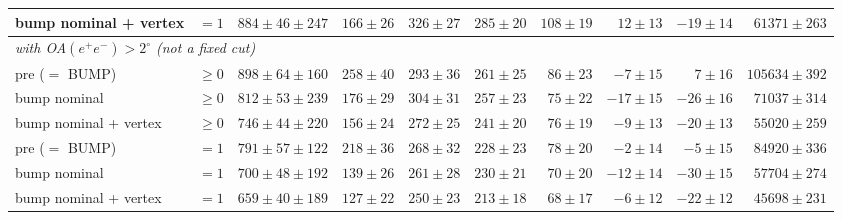 \begin{table}[H]
\begin{tabular}{llcrrrrrrr}
bump nominal + vertex & $=1$ & $884\pm46\pm247$ & $166\pm26$ & $326\pm27$ & $285\pm20$ & $108\pm19$ & $12\pm13$ & $-19\pm14$ & $61371\pm263$ \\
\midrule
\multicolumn{10}{l}{\emph{with OA$(e^+e^-)>2^\circ$ (not a fixed cut)}} \\
pre ($=$ BUMP) & $\geq0$ & $898\pm64\pm160$ & $258\pm40$ & $293\pm36$ & $261\pm25$ & $86\pm23$ & $-7\pm15$ & $7\pm16$ & $105634\pm392$ \\
bump nominal & $\geq0$ & $812\pm53\pm239$ & $176\pm29$ & $304\pm31$ & $257\pm23$ & $75\pm22$ & $-17\pm15$ & $-26\pm16$ & $71037\pm314$ \\
bump nominal + vertex & $\geq0$ & $746\pm44\pm220$ & $156\pm24$ & $272\pm25$ & $241\pm20$ & $76\pm19$ & $-9\pm13$ & $-20\pm13$ & $55020\pm259$ \\
\addlinespace
pre ($=$ BUMP) & $=1$ & $791\pm57\pm122$ & $218\pm36$ & $268\pm32$ & $228\pm23$ & $78\pm20$ & $-2\pm14$ & $-5\pm15$ & $84920\pm336$ \\
bump nominal & $=1$ & $700\pm48\pm192$ & $139\pm26$ & $261\pm28$ & $230\pm21$ & $70\pm20$ & $-12\pm14$ & $-30\pm15$ & $57704\pm274$ \\
bump nominal + vertex & $=1$ & $659\pm40\pm189$ & $127\pm22$ & $250\pm23$ & $213\pm18$ & $68\pm17$ & $-6\pm12$ & $-22\pm12$ & $45698\pm231$ \\
\bottomrule
\end{tabular}
\end{table}
